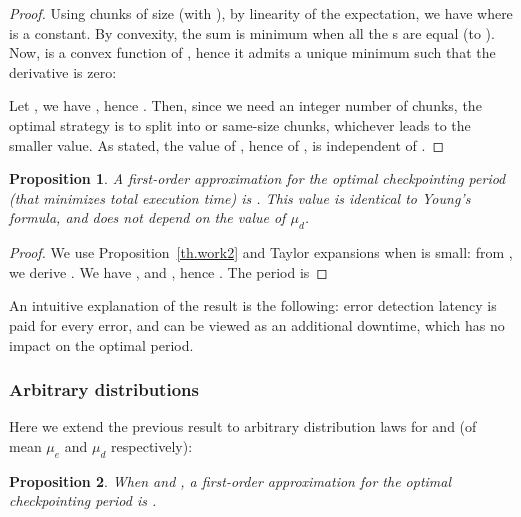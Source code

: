 \documentclass[10pt,table]{article}
\newtheorem{proposition}{Proposition}
\newcommand{\ema}[1]{\ensuremath{#1}\xspace}
\newcommand{\mue}{\ema{\mu_{e}}}
\newcommand{\mud}{\ema{\mu_{d}}}
\begin{document}
\begin{proof}
Using  chunks of size  (with ), by linearity of the expectation, we have 
where  is a constant. By convexity, the sum is minimum when all the
s are equal (to ). Now,  is a convex function of , hence it admits a unique minimum  such that the derivative is zero:


Let , we have , hence
.
Then, since we need an integer number of chunks, the optimal strategy  is
to split  into  or
 same-size chunks, whichever leads to the smaller value.
As stated, the value of , hence of , is independent of .
\end{proof}

\begin{proposition}
\label{th.work3}
A first-order approximation for the optimal checkpointing period (that minimizes total execution time) is 
.
This value  is identical to Young's formula, and does not depend on the value of \mud.
\end{proposition}

\begin{proof}
We use  Proposition~\ref{th.work2} and Taylor expansions 
when  is small: from ,
we derive . We have  ,
and , hence . The period
is 

\end{proof}

An intuitive explanation of the result is the following: error
detection latency is paid for every error,
and can be viewed as an additional downtime, which has no impact on the optimal period.

\subsubsection{Arbitrary distributions}
\label{sec.sub.arbi}

Here we extend the previous result to arbitrary distribution laws for  and  (of mean \mue and \mud respectively):

\begin{proposition}
\label{th.work4}
When  and , a first-order approximation 
for the optimal checkpointing period is 
.
\end{proposition}
\end{document}
